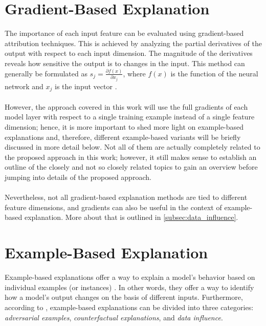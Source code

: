 \section{Gradient-Based Explanation}
The importance of each input feature can be evaluated using gradient-based attribution techniques. This is achieved by analyzing the partial derivatives of the output with respect to each input dimension. The magnitude of the derivatives reveals how sensitive the output is to changes in the input. This method can generally be formulated as $s_j=\frac{\partial f(x)}{\partial x_j}$, where $f(x)$ is the function of the neural network and $x_j$ is the input vector \cite{DBLP:journals/tist/ZhaoCYLDCWYD24}.
\\\\
However, the approach covered in this work will use the full gradients of each model layer with respect to a single training example instead of a single feature dimension; hence, it is more important to shed more light on example-based explanations and, therefore, different example-based variants will be briefly discussed in more detail below. Not all of them are actually completely related to the proposed approach in this work; however, it still makes sense to establish an outline of the closely and not so closely related topics to gain an overview before jumping into details of the proposed approach.
\\\\
Nevertheless, not all gradient-based explanation methods are tied to different feature dimensions, and gradients can also be useful in the context of example-based explanation. More about that is outlined in \autoref{subsec:data_influence}.

\section{Example-Based Explanation}
Example-based explanations offer a way to explain a model's behavior based on individual examples (or instances) \cite{DBLP:conf/icml/KohL17}. In other words, they offer a way to identify how a model's output changes on the basis of different inputs. Furthermore, according to \cite{DBLP:journals/tist/ZhaoCYLDCWYD24}, example-based explanations can be divided into three categories: \textit{adversarial examples}, \textit{counterfactual explanations}, and \textit{data influence}.

